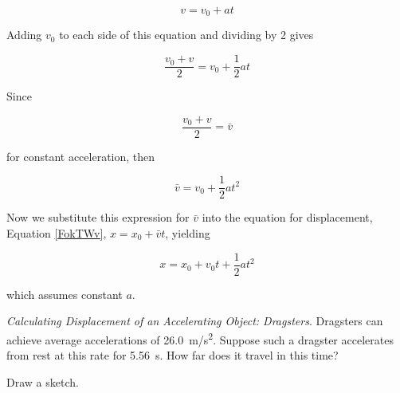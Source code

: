 \documentclass[dvipsnames]{article}
\def\xydirection{
        \begin{axis}[width=2.4cm,
            height=2.4cm,
            ticks=none,
            axis lines=center,
            ylabel=$y$,
            xlabel=$x$
        ]
        \end{axis}
}
\begin{document}
\begin{equation*}
    v = v_0 + a t
\end{equation*}

Adding $v_0$ to each side of this equation and dividing by 2 gives

\begin{equation*}
    \frac{v_0 + v}{2} = v_0 + \frac{1}{2} a t
\end{equation*}

Since

\begin{equation*}
    \frac{v_0 + v}{2} = \bar{v}
\end{equation*}

for constant acceleration, then 

\begin{equation*}
    \bar{v} = v_0 + \frac{1}{2} a t^2 
\end{equation*}

Now we substitute this expression for $\bar{v}$ into the equation for displacement, Equation \eqref{FokTWv}, $x = x_0 + \bar{v} t$, yielding

\begin{equation} \label{03Tfzm}
    x = x_0 + v_0 t + \frac{1}{2} a t^2
\end{equation}

which assumes constant $a$.

\vspace{1em}

\cyanhrule

\begin{example} \label{7ddBPA}
    \textit{Calculating Displacement of an Accelerating Object: Dragsters}. Dragsters can achieve average accelerations of \SI{26.0}{m/s^2}. Suppose such a dragster accelerates from rest at this rate for \SI{5.56}{s}. How far does it travel in this time?
\end{example}

\Solution Draw a sketch.

\begin{center}
\end{center}
\end{document}
